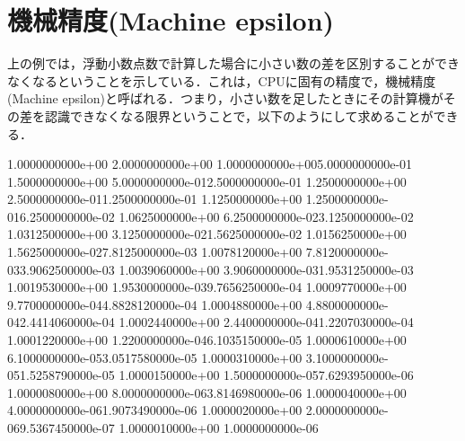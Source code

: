 \documentclass{article}
\begin{document}
\section{\textbf{機械精度(Machine epsilon)}}
\begin{maplelatex}\begin{Maple Normal}{
上の例では，浮動小数点数で計算した場合に小さい数の差を区別することができなくなるということを示している．これは，CPUに固有の精度で，機械精度(Machine epsilon)と呼ばれる．つまり，小さい数を足したときにその計算機がその差を認識できなくなる限界ということで，以下のようにして求めることができる．}\end{Maple Normal}
\end{maplelatex}
\begin{maplegroup}
\begin{mapleinput}
\end{mapleinput}
\mapleresult
\begin{maplelatex}
\end{maplelatex}
\mapleresult
\begin{maplelatex}
\end{maplelatex}
\mapleresult
\begin{maplelatex}
\end{maplelatex}
\mapleresult
1.0000000000e+00 2.0000000000e+00 1.0000000000e+005.0000000000e-01 1.5000000000e+00 5.0000000000e-012.5000000000e-01 1.2500000000e+00 2.5000000000e-011.2500000000e-01 1.1250000000e+00 1.2500000000e-016.2500000000e-02 1.0625000000e+00 6.2500000000e-023.1250000000e-02 1.0312500000e+00 3.1250000000e-021.5625000000e-02 1.0156250000e+00 1.5625000000e-027.8125000000e-03 1.0078120000e+00 7.8120000000e-033.9062500000e-03 1.0039060000e+00 3.9060000000e-031.9531250000e-03 1.0019530000e+00 1.9530000000e-039.7656250000e-04 1.0009770000e+00 9.7700000000e-044.8828120000e-04 1.0004880000e+00 4.8800000000e-042.4414060000e-04 1.0002440000e+00 2.4400000000e-041.2207030000e-04 1.0001220000e+00 1.2200000000e-046.1035150000e-05 1.0000610000e+00 6.1000000000e-053.0517580000e-05 1.0000310000e+00 3.1000000000e-051.5258790000e-05 1.0000150000e+00 1.5000000000e-057.6293950000e-06 1.0000080000e+00 8.0000000000e-063.8146980000e-06 1.0000040000e+00 4.0000000000e-061.9073490000e-06 1.0000020000e+00 2.0000000000e-069.5367450000e-07 1.0000010000e+00 1.0000000000e-06
\end{maplegroup}
\end{document}
